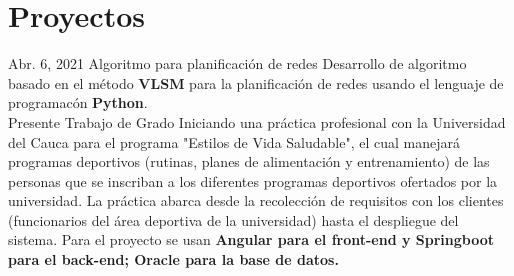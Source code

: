 \documentclass[american]{cv-class}
\begin{document}
	\section{Proyectos}
    \begin{entrylist}
    \entry
    	{Abr. 6, 2021}
    	{Algoritmo para planificación de redes}
    	{ }
    	{\justifying Desarrollo de algoritmo basado en el método \textbf{VLSM} 
    	para la planificación de redes usando el lenguaje de programacón \textbf{Python}.}
    \\
    \entry
    	{Presente}
    	{Trabajo de Grado}
    	{ }
    	{\justifying Iniciando una práctica profesional con la Universidad del Cauca para el programa "Estilos de Vida Saludable", el cual manejará programas deportivos (rutinas, planes de alimentación y entrenamiento) de las personas que se inscriban a los diferentes programas deportivos ofertados por la universidad. La práctica abarca desde la recolección de requisitos con los clientes (funcionarios del área deportiva de la universidad) hasta el despliegue del sistema. Para el proyecto se usan \textbf{Angular para el front-end y Springboot para el back-end; Oracle para la base de datos.}}
    	
    \end{entrylist}
\end{document}
